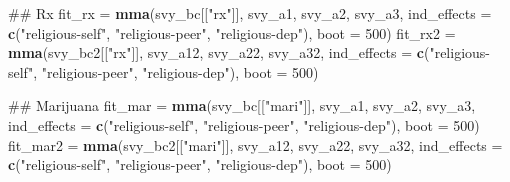 \documentclass[]{DissertateUSU}
\newenvironment{Shaded}{\begin{snugshade}}{\end{snugshade}}
\newcommand{\KeywordTok}[1]{\textcolor[rgb]{0.13,0.29,0.53}{\textbf{#1}}}
\newcommand{\DataTypeTok}[1]{\textcolor[rgb]{0.13,0.29,0.53}{#1}}
\newcommand{\DecValTok}[1]{\textcolor[rgb]{0.00,0.00,0.81}{#1}}
\newcommand{\StringTok}[1]{\textcolor[rgb]{0.31,0.60,0.02}{#1}}
\newcommand{\NormalTok}[1]{#1}
\begin{document}
\begin{Shaded}
\begin{Highlighting}[]
\NormalTok{## Rx}
\NormalTok{fit_rx =}\StringTok{ }\KeywordTok{mma}\NormalTok{(svy_bc[[}\StringTok{"rx"}\NormalTok{]],}
\NormalTok{              svy_a1,}
\NormalTok{              svy_a2,}
\NormalTok{              svy_a3,}
              \DataTypeTok{ind_effects =} \KeywordTok{c}\NormalTok{(}\StringTok{"religious-self"}\NormalTok{,}
                              \StringTok{"religious-peer"}\NormalTok{,}
                              \StringTok{"religious-dep"}\NormalTok{),}
              \DataTypeTok{boot =} \DecValTok{500}\NormalTok{)}
\NormalTok{fit_rx2 =}\StringTok{ }\KeywordTok{mma}\NormalTok{(svy_bc2[[}\StringTok{"rx"}\NormalTok{]],}
\NormalTok{               svy_a12,}
\NormalTok{               svy_a22,}
\NormalTok{               svy_a32,}
               \DataTypeTok{ind_effects =} \KeywordTok{c}\NormalTok{(}\StringTok{"religious-self"}\NormalTok{,}
                               \StringTok{"religious-peer"}\NormalTok{,}
                               \StringTok{"religious-dep"}\NormalTok{),}
               \DataTypeTok{boot =} \DecValTok{500}\NormalTok{)}

\NormalTok{## Marijuana}
\NormalTok{fit_mar =}\StringTok{ }\KeywordTok{mma}\NormalTok{(svy_bc[[}\StringTok{"mari"}\NormalTok{]],}
\NormalTok{             svy_a1,}
\NormalTok{             svy_a2,}
\NormalTok{             svy_a3,}
             \DataTypeTok{ind_effects =} \KeywordTok{c}\NormalTok{(}\StringTok{"religious-self"}\NormalTok{,}
                             \StringTok{"religious-peer"}\NormalTok{,}
                             \StringTok{"religious-dep"}\NormalTok{),}
             \DataTypeTok{boot =} \DecValTok{500}\NormalTok{)}
\NormalTok{fit_mar2 =}\StringTok{ }\KeywordTok{mma}\NormalTok{(svy_bc2[[}\StringTok{"mari"}\NormalTok{]],}
\NormalTok{              svy_a12,}
\NormalTok{              svy_a22,}
\NormalTok{              svy_a32,}
              \DataTypeTok{ind_effects =} \KeywordTok{c}\NormalTok{(}\StringTok{"religious-self"}\NormalTok{,}
                              \StringTok{"religious-peer"}\NormalTok{,}
                              \StringTok{"religious-dep"}\NormalTok{),}
              \DataTypeTok{boot =} \DecValTok{500}\NormalTok{)}


\end{Highlighting}
\end{Shaded}
\end{document}
